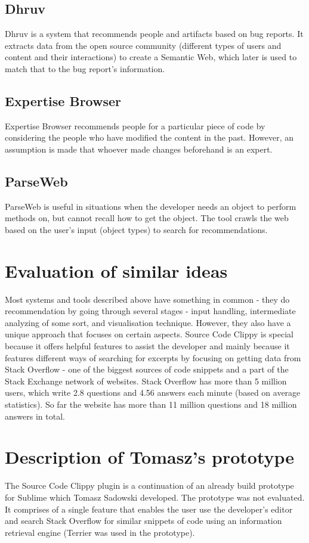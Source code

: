 \documentclass{l4proj}
\begin{document}
\subsection{Dhruv}
Dhruv is a system that recommends people and artifacts based on bug reports. It extracts data from the open source community (different types of users and content and their interactions) to create a Semantic Web, which later is used to match that to the bug report's information.

\subsection{Expertise Browser}
Expertise Browser recommends people for a particular piece of code by considering the people who have modified the content in the past. However, an assumption is made that whoever made changes beforehand is an expert.

\subsection{ParseWeb}
ParseWeb is useful in situations when the developer needs an object to perform methods on, but cannot recall how to get the object. The tool crawls the web based on the user's input (object types) to search for recommendations.

\section{Evaluation of similar ideas}
Most systems and tools described above have something in common - they do recommendation by going through several stages - input handling, intermediate analyzing of some sort, and visualisation technique. However, they also have a unique approach that focuses on certain aspects. Source Code Clippy is special because it offers helpful features to assist the developer and mainly because it features different ways of searching for excerpts by focusing on getting data from Stack Overflow - one of the biggest sources of code snippets and a part of the Stack Exchange network of websites. Stack Overflow has more than 5 million users, which write 2.8 questions and 4.56 answers each minute (based on average statistics). So far the website has more than 11 million questions and 18 million answers in total.

\section{Description of Tomasz's prototype}
The Source Code Clippy plugin is a continuation of an already build prototype for Sublime which Tomasz Sadowski developed. The prototype was not evaluated. It comprises of a single feature that enables the user use the developer's editor and search Stack Overflow for similar snippets of code using an information retrieval engine (Terrier was used in the prototype). 
\end{document}
